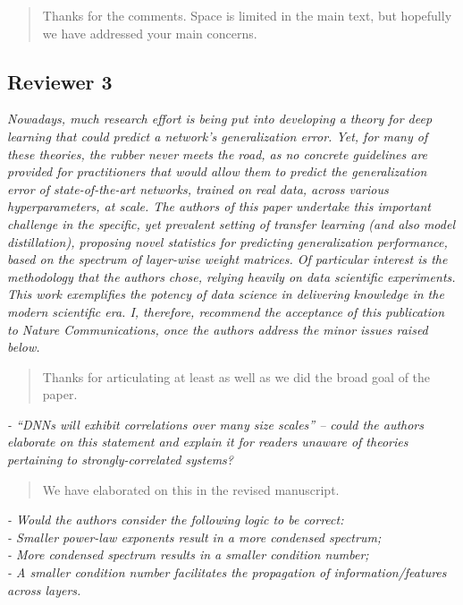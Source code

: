 \documentclass[11pt]{article}
\begin{document}
\begin{quote}
Thanks for the comments.
Space is limited in the main text, but hopefully we have addressed your main concerns.
\end{quote}


\subsection*{Reviewer 3}

\noindent
\emph{%
Nowadays, much research effort is being put into developing a theory for deep learning that could predict a network's generalization error. Yet, for many of these theories, the rubber never meets the road, as no concrete guidelines are provided for practitioners that would allow them to predict the generalization error of state-of-the-art networks, trained on real data, across various hyperparameters, at scale. The authors of this paper undertake this important challenge in the specific, yet prevalent setting of transfer learning (and also model distillation), proposing novel statistics for predicting generalization performance, based on the spectrum of layer-wise weight matrices. Of particular interest is the methodology that the authors chose, relying heavily on data scientific experiments. This work exemplifies the potency of data science in delivering knowledge in the modern scientific era. I, therefore, recommend the acceptance of this publication to Nature Communications,
once the authors address the minor issues raised below.
}

\begin{quote}
Thanks for articulating at least as well as we did the broad goal of the paper.
\end{quote}

\noindent
\emph{%
- ``DNNs will exhibit correlations over many size scales'' -- could the authors elaborate on this statement and explain it for readers unaware of theories pertaining to strongly-correlated systems?
}

\begin{quote}
We have elaborated on this 
in the revised manuscript.
\end{quote}

\noindent
\emph{%
- Would the authors consider the following logic to be correct: \\
- Smaller power-law exponents result in a more condensed spectrum; \\
- More condensed spectrum results in a smaller condition number; \\
- A smaller condition number facilitates the propagation of information/features across layers.
}
\end{document}

